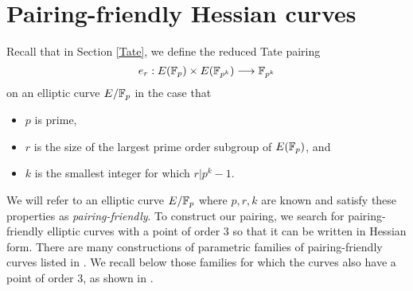 \section{Pairing-friendly Hessian curves}

Recall that in Section \ref{Tate}, we define the reduced Tate pairing
\[e_{r}:E(\mathbb{F}_{p}) \times E(\mathbb{F}_{p^{k}}) \longrightarrow \mathbb{F}_{p^{k}}\] on an elliptic curve $E/\mathbb{F}_{p}$ in the case that 
\begin{itemize}\label{props}
\item $p$ is prime,
\item $r$ is the size of the largest prime order subgroup of $E(\mathbb{F}_{p})$, and
\item $k$ is the smallest integer for which $r | p^{k}-1$.
\end{itemize}
We will refer to an elliptic curve $E/\mathbb{F}_{p}$ where $p,r,k$ are known and satisfy these properties as \emph{pairing-friendly}. To construct our pairing, we search for pairing-friendly elliptic curves with a point of order 3 so that it can be written in Hessian form. There are many constructions of parametric families of pairing-friendly curves listed in \cite{2010/freeman}. We recall below those families for which the curves also have a point of order 3, as shown in \cite[Section 5]{2015/hessian}.




